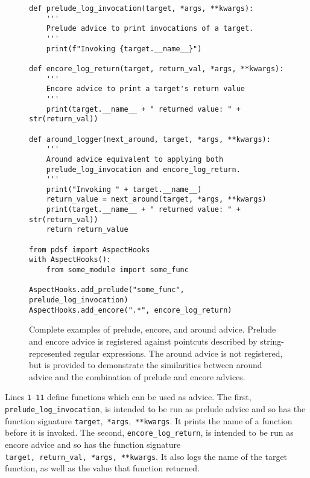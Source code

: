 \begin{figure}
    \begin{lstlisting}
def prelude_log_invocation(target, *args, **kwargs):
    '''
    Prelude advice to print invocations of a target.
    '''
    print(f"Invoking {target.__name__}")
    
def encore_log_return(target, return_val, *args, **kwargs):
    '''
    Encore advice to print a target's return value
    '''
    print(target.__name__ + " returned value: " + str(return_val))
    
def around_logger(next_around, target, *args, **kwargs):
    '''
    Around advice equivalent to applying both
    prelude_log_invocation and encore_log_return.
    '''
    print("Invoking " + target.__name__)
    return_value = next_around(target, *args, **kwargs)
    print(target.__name__ + " returned value: " + str(return_val))
    return return_value

from pdsf import AspectHooks
with AspectHooks():
    from some_module import some_func

AspectHooks.add_prelude("some_func", prelude_log_invocation)
AspectHooks.add_encore(".*", encore_log_return)
    \end{lstlisting}
    \caption{Complete examples of prelude, encore, and around advice. Prelude
    and encore advice is registered against
    pointcuts described by string-represented regular expressions. The around
    advice is not registered, but is provided to demonstrate the similarities
    between around advice and the combination of prelude and encore advices.}
    \label{fig:registering_an_aspect_against_aspecthooks}
\end{figure}

Lines \texttt{1}--\texttt{11} define functions which can be used as
advice. The first, \lstinline{prelude_log_invocation}, is intended to be run as
prelude advice and so has the function signature
\lstinline{target},~\lstinline{*args},~\lstinline{**kwargs}. It prints the name
of a function before it is invoked. The second, \lstinline{encore_log_return},
is intended to be run as encore advice and so has the function signature
\lstinline{target,}~\lstinline{return_val,}~\lstinline{*args,}~\lstinline{**kwargs}.
It also logs the name of the target function, as well as the value that function
returned.


